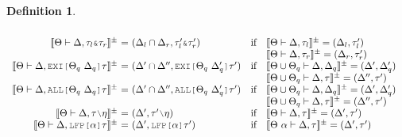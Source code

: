 \documentclass[acmsmall]{acmart}
\theoremstyle{definition}
\newtheorem{definition}{Definition}[section]
\begin{document}
\begin{definition}
\[\begin{array}[t]{r@{}c@{}lcl}
      \\

      \llbracket \Theta \entails \Delta, \tau_l\J{\&}\tau_r \rrbracket^\pm 
      &\ =\ & 
      (\Delta_l \cap \Delta_r, \tau_l'\J{\&}\tau_r')
      &\text{if}& 
      \begin{array}[t]{@{}l}
        \llbracket \Theta \entails \Delta, \tau_l \rrbracket^\pm = (\Delta_l, \tau_l')
        \\
        \llbracket \Theta \entails \Delta, \tau_r \rrbracket^{\pm} = (\Delta_r, \tau_r')
      \end{array}

      \\

      \llbracket \Theta \entails \Delta, \J{EXI[}\Theta_q\ \Delta_q \J{]} \tau \rrbracket^\pm 
      &\ =\ & 
      (\Delta' \cap \Delta'', \J{EXI[}\Theta_q\ \Delta_q' \J{]}\tau')
      &\text{if}& 
      \begin{array}[t]{@{}l}
        \llbracket \Theta \cup \Theta_q \entails \Delta, \Delta_q \rrbracket^\pm = (\Delta', \Delta_q')
        \\
        \llbracket \Theta \cup \Theta_q \entails \Delta, \tau \rrbracket^{\pm} = (\Delta'', \tau')
      \end{array}

      \\

      \llbracket \Theta \entails \Delta, \J{ALL[}\Theta_q\ \Delta_q \J{]} \tau \rrbracket^\pm 
      &\ =\ & 
      (\Delta' \cap \Delta'', \J{ALL[}\Theta_q\ \Delta_q' \J{]}\tau')
      &\text{if}& 
      \begin{array}[t]{@{}l}
        \llbracket \Theta \cup \Theta_q \entails \Delta, \Delta_q \rrbracket^\pm = (\Delta', \Delta_q')
        \\
        \llbracket \Theta \cup \Theta_q \entails \Delta, \tau \rrbracket^{\pm} = (\Delta'', \tau')
      \end{array}

      \\

      \llbracket \Theta \entails \Delta, \tau \typdiff \eta \rrbracket^\pm 
      &\ =\ & 
      (\Delta', \tau' \typdiff \eta)
      &\text{if}& 
      \llbracket \Theta \entails \Delta, \tau \rrbracket^\pm = (\Delta', \tau')

      \\

      \llbracket \Theta \entails \Delta, \J{LFP[}\alpha \J{]} \tau \rrbracket^\pm 
      &\ =\ & 
      (\Delta', \J{LFP[}\alpha \J{]}\tau')
      &\text{if}& 
      \llbracket \Theta\ \alpha \entails \Delta, \tau \rrbracket^{\pm} = (\Delta', \tau')
      \\
  \end{array}
  \]
\end{definition}
\end{document}
